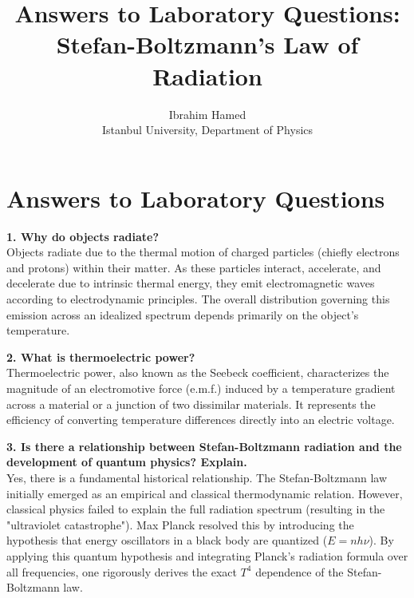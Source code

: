 \documentclass[journal]{IEEEtran}
\begin{document}
\title{Answers to Laboratory Questions:\\ Stefan-Boltzmann's Law of Radiation}
\author{Ibrahim Hamed \\ Istanbul University, Department of Physics}

\maketitle

\section{Answers to Laboratory Questions}

\textbf{1. Why do objects radiate?} \\
Objects radiate due to the thermal motion of charged particles (chiefly electrons and protons) within their matter. As these particles interact, accelerate, and decelerate due to intrinsic thermal energy, they emit electromagnetic waves according to electrodynamic principles. The overall distribution governing this emission across an idealized spectrum depends primarily on the object's temperature.

\textbf{2. What is thermoelectric power?} \\
Thermoelectric power, also known as the Seebeck coefficient, characterizes the magnitude of an electromotive force (e.m.f.) induced by a temperature gradient across a material or a junction of two dissimilar materials. It represents the efficiency of converting temperature differences directly into an electric voltage. 

\textbf{3. Is there a relationship between Stefan-Boltzmann radiation and the development of quantum physics? Explain.} \\
Yes, there is a fundamental historical relationship. The Stefan-Boltzmann law initially emerged as an empirical and classical thermodynamic relation. However, classical physics failed to explain the full radiation spectrum (resulting in the "ultraviolet catastrophe"). Max Planck resolved this by introducing the hypothesis that energy oscillators in a black body are quantized ($E = nh\nu$). By applying this quantum hypothesis and integrating Planck's radiation formula over all frequencies, one rigorously derives the exact $T^4$ dependence of the Stefan-Boltzmann law.
\end{document}

